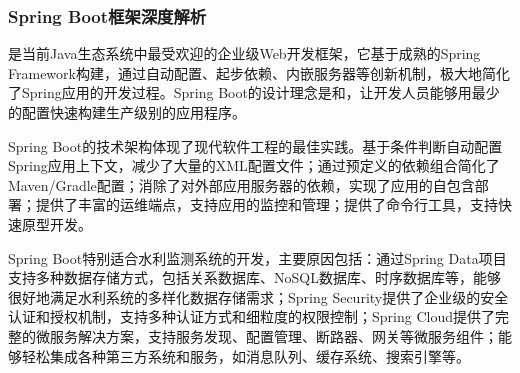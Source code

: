 \hypertarget{spring-bootux6846ux67b6ux6df1ux5ea6ux89e3ux6790}{%
\subsubsection{Spring Boot框架深度解析}\label{spring-bootux6846ux67b6ux6df1ux5ea6ux89e3ux6790}}

是当前Java生态系统中最受欢迎的企业级Web开发框架，它基于成熟的Spring Framework构建，通过自动配置、起步依赖、内嵌服务器等创新机制，极大地简化了Spring应用的开发过程。Spring Boot的设计理念是和，让开发人员能够用最少的配置快速构建生产级别的应用程序。

Spring Boot的技术架构体现了现代软件工程的最佳实践。基于条件判断自动配置Spring应用上下文，减少了大量的XML配置文件；通过预定义的依赖组合简化了Maven/Gradle配置；消除了对外部应用服务器的依赖，实现了应用的自包含部署；提供了丰富的运维端点，支持应用的监控和管理；提供了命令行工具，支持快速原型开发。

Spring Boot特别适合水利监测系统的开发，主要原因包括：通过Spring Data项目支持多种数据存储方式，包括关系数据库、NoSQL数据库、时序数据库等，能够很好地满足水利系统的多样化数据存储需求；Spring Security提供了企业级的安全认证和授权机制，支持多种认证方式和细粒度的权限控制；Spring Cloud提供了完整的微服务解决方案，支持服务发现、配置管理、断路器、网关等微服务组件；能够轻松集成各种第三方系统和服务，如消息队列、缓存系统、搜索引擎等。

